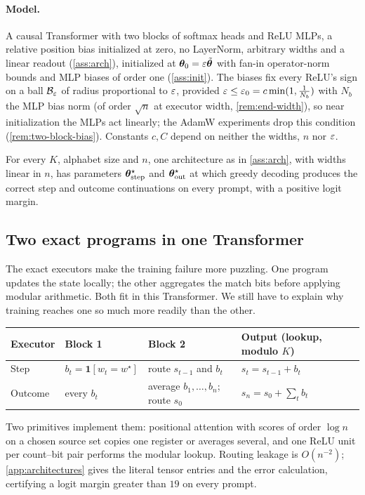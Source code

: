 \paragraph{Model.} A causal Transformer with two blocks of softmax heads and ReLU MLPs, a relative position bias
initialized at zero, no LayerNorm, arbitrary widths and a linear readout (\cref{ass:arch}), initialized at
$\bm\theta_0=\varepsilon\tilde{\bm\theta}$ with fan-in operator-norm bounds and MLP biases of order one (\cref{ass:init}). The biases fix
every ReLU's sign on a ball $\mathcal B_{\varepsilon}$ of radius proportional to $\varepsilon$, provided
$\varepsilon\le\varepsilon_0=c\min(1,\frac{1}{N_b})$ with $N_b$ the MLP bias norm (of order $\sqrt n$ at executor width, \cref{rem:end-width}), so near initialization the MLPs act linearly;
the AdamW experiments drop this condition (\cref{rem:two-block-bias}). Constants $c,C$ depend on neither the widths, $n$ nor
$\varepsilon$.

\begin{proposition}
\label{prop:represent}
For every $K$, alphabet size and $n$, one architecture as in \cref{ass:arch}, with widths linear in $n$, has parameters
$\bm\theta^\star_{\mathrm{step}}$ and $\bm\theta^\star_{\mathrm{out}}$ at which greedy decoding produces the correct step and outcome continuations on every prompt, with
a positive logit margin.
\end{proposition}

\subsection{Two exact programs in one Transformer}
\label{sec:exact-programs}
The exact executors make the training failure more puzzling. One program updates the state locally; the other aggregates the match
bits before applying modular arithmetic. Both fit in this Transformer. We still have to explain why training reaches one so much
more readily than the other.

\begin{center}
\small
\begin{tabular}{@{}llll@{}}
\toprule
Executor & Block 1 & Block 2 & Output (lookup, modulo $K$)\\
\midrule
Step & $b_t=\mathbf 1[w_t=w^\star]$ & route $s_{t-1}$ and $b_t$ & $s_t=s_{t-1}+b_t$\\
Outcome & every $b_t$ & average $b_1,\ldots,b_n$; route $s_0$ & $s_n=s_0+\sum_tb_t$\\
\bottomrule
\end{tabular}
\end{center}
Two primitives implement them: positional attention with scores of order $\log n$ on a chosen source set copies one register or
averages several, and one ReLU unit per count--bit pair performs the modular lookup. Routing leakage is $O(n^{-2})$;
\cref{app:architectures} gives the literal tensor entries and the error calculation, certifying a logit margin greater than $19$ on every
prompt.

